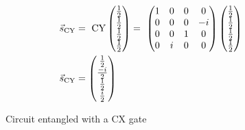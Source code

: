 \begin{equation}
    \centering
    \begin{split}
        \vec{s}_{\mathrm{CY}} &=\ \mathrm{CY}\begin{pmatrix}
            \frac{1}{2}\\\frac{1}{2}\\\frac{1}{2}\\\frac{1}{2}
        \end{pmatrix} =\  \begin{pmatrix}
        1 & 0 & 0 & 0 \\
        0 & 0 & 0 & -i \\
        0 & 0 & 1 & 0 \\
        0 & i & 0 & 0
    \end{pmatrix}\begin{pmatrix}
            \frac{1}{2}\\\frac{1}{2}\\\frac{1}{2}\\\frac{1}{2}
        \end{pmatrix} \\
        \vec{s}_{\mathrm{CY}} &= \begin{pmatrix}
            \frac{1}{2}\\\frac{-i}{2}\\\frac{1}{2}\\\frac{i}{2}
        \end{pmatrix}
    \end{split}
    \label{equation:cy_entanglement}
\end{equation}


\begin{figure}[!h]
    \centering
    \caption{Circuit entangled with a $\mathrm{CX}$ gate}
    \label{fig:cx_entanglement}
\end{figure}

